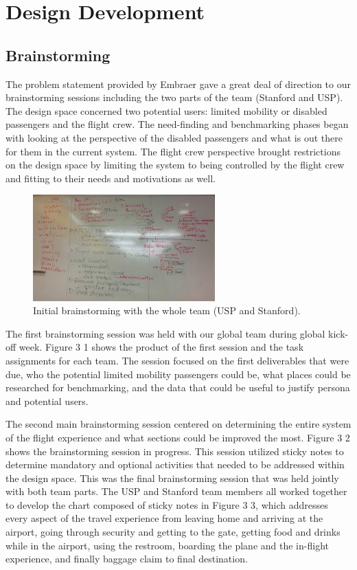 \chapter{Design Development}
\section{Brainstorming}
The problem statement provided by Embraer gave a great deal of direction to our brainstorming sessions including the two parts of the team (Stanford and USP).  The design space concerned two potential users: limited mobility or disabled passengers and the flight crew.  The need-finding and benchmarking phases began with looking at the perspective of the disabled passengers and what is out there for them in the current system.  The flight crew perspective brought restrictions on the design space by limiting the system to being controlled by the flight crew and fitting to their needs and motivations as well.

\begin{figure}[h]
  \centering
     \includegraphics[width=7cm]{images/image017}
   \caption{Initial brainstorming with the whole team (USP and Stanford).}
  \label{fig:17}
\end{figure}

The first brainstorming session was held with our global team during global kick-off week.  Figure 3 1 shows the product of the first session and the task assignments for each team.  The session focused on the first deliverables that were due, who the potential limited mobility passengers could be, what places could be researched for benchmarking, and the data that could be useful to justify persona and potential users.

The second main brainstorming session centered on determining the entire system of the flight experience and what sections could be improved the most. Figure 3 2 shows the brainstorming session in progress.  This session utilized sticky notes to determine mandatory and optional activities that needed to be addressed within the design space. This was the final brainstorming session that was held jointly with both team parts.  The USP and Stanford team members all worked together to develop the chart composed of sticky notes in Figure 3 3, which addresses every aspect of the travel experience from leaving home and arriving at the airport, going through security and getting to the gate, getting food and drinks while in the airport, using the restroom, boarding the plane and the in-flight experience, and finally baggage claim to final destination.

